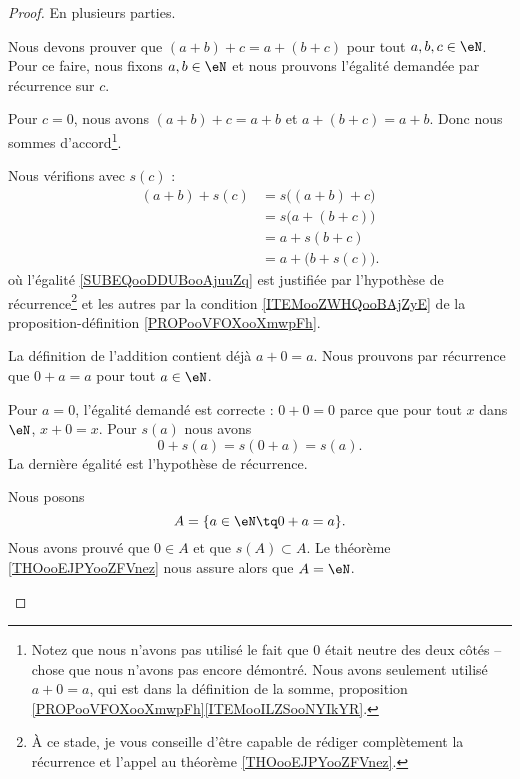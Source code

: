 \begin{proof}
	En plusieurs parties.
	\begin{subproof}
		\spitem[Associative]
		Nous devons prouver que \( (a+b)+c=a+(b+c)\) pour tout \( a,b,c\in \eN\). Pour ce faire, nous fixons \( a,b\in\eN\) et nous prouvons l'égalité demandée par récurrence sur \( c\).

		Pour \( c=0\), nous avons \( (a+b)+c=a+b\) et \( a+(b+c)=a+b\). Donc nous sommes d'accord\footnote{Notez que nous n'avons pas utilisé le fait que \( 0\) était neutre des deux côtés -- chose que nous n'avons pas encore démontré. Nous avons seulement utilisé \( a+0=a\), qui est dans la définition de la somme, proposition \ref{PROPooVFOXooXmwpFh}\ref{ITEMooILZSooNYIkYR}.}.

		Nous vérifions avec \( s(c)\) :
		\begin{subequations}
			\begin{align}
				(a+b)+s(c) & =s\big( (a+b)+c \big)                              \\
				           & =s\big( a+(b+c) \big)  \label{SUBEQooDDUBooAjuuZq} \\
				           & =a+s(b+c)                                          \\
				           & =a+\big( b+s(c) \big).
			\end{align}
		\end{subequations}
		où l'égalité \eqref{SUBEQooDDUBooAjuuZq} est justifiée par l'hypothèse de récurrence\footnote{À ce stade, je vous conseille d'être capable de rédiger complètement la récurrence et l'appel au théorème \ref{THOooEJPYooZFVnez}.} et les autres par la condition \ref{ITEMooZWHQooBAjZyE} de la proposition-définition \ref{PROPooVFOXooXmwpFh}.

		\spitem[Neutre]
		La définition de l'addition contient déjà \( a+0=a\). Nous prouvons par récurrence que \( 0+a=a\) pour tout \( a\in \eN\).

		Pour \( a=0\), l'égalité demandé est correcte : \( 0+0=0\) parce que pour tout \( x\) dans \( \eN\), \( x+0=x\). Pour \( s(a)\) nous avons
		\begin{equation}
			0+s(a)=s(0+a)=s(a).
		\end{equation}
		La dernière égalité est l'hypothèse de récurrence.

		Nous posons
		\begin{equation}
			A=\{ a\in \eN\tq 0+a=a \}.
		\end{equation}
		Nous avons prouvé que \( 0\in A\) et que \( s(A)\subset A\). Le théorème \ref{THOooEJPYooZFVnez} nous assure alors que \( A=\eN\).
  

\end{subproof}
\end{proof}
